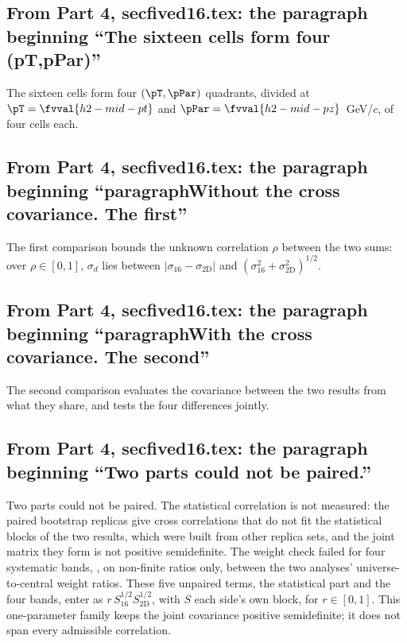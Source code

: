 \subsection{From Part 4, secfived16.tex: the paragraph beginning ``The sixteen cells form four (pT,pPar)''}
The sixteen cells form four $(\pT,\pPar)$ quadrants, divided at $\pT=\fvval{h2-mid-pt}$ and $\pPar=\fvval{h2-mid-pz}$~GeV/$c$, of four cells each.

\subsection{From Part 4, secfived16.tex: the paragraph beginning ``paragraphWithout the cross covariance. The first''}
The first comparison bounds the unknown correlation $\rho$ between the two sums: over $\rho\in[0,1]$, $\sigma_d$ lies between $|\sigma_{16}-\sigma_{\mathrm{2D}}|$ and $(\sigma_{16}^2+\sigma_{\mathrm{2D}}^2)^{1/2}$.

\subsection{From Part 4, secfived16.tex: the paragraph beginning ``paragraphWith the cross covariance. The second''}
The second comparison evaluates the covariance between the two results from what they share, and tests the four differences jointly.

\subsection{From Part 4, secfived16.tex: the paragraph beginning ``Two parts could not be paired.''}
Two parts could not be paired. The statistical correlation is not measured: the paired bootstrap replicas give cross correlations that do not fit the statistical blocks of the two results, which were built from other replica sets, and the joint matrix they form is not positive semidefinite. The weight check failed for four systematic bands, , on non-finite ratios only, between the two analyses' universe-to-central weight ratios. These five unpaired terms, the statistical part and the four bands, enter as $r\,S_{16}^{1/2}S_{\mathrm{2D}}^{1/2}$, with $S$ each side's own block, for $r\in[0,1]$. This one-parameter family keeps the joint covariance positive semidefinite; it does not span every admissible correlation.

